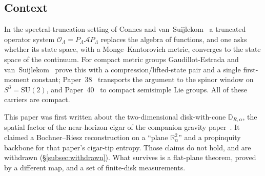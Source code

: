 \documentclass[11pt,a4paper]{article}
\theoremstyle{plain}
\theoremstyle{definition}
\newcommand{\disk}{\mathbb{D}}
\newcommand{\cone}{\disk_{R,\alpha}}
\newcommand{\Op}{\mathcal{O}}
\newcommand{\Acal}{\mathcal{A}}
\newcommand{\R}{\mathbb{R}}
\begin{document}
\subsection{Context}
In the spectral-truncation setting of Connes and
van~Suijlekom~\cite{connes_vs2021} a truncated operator system
$\Op_{\Lambda}=P_{\Lambda}\Acal P_{\Lambda}$ replaces the algebra of
functions, and one asks whether its state space, with a
Monge--Kantorovich metric, converges to the state space of the
continuum. For compact metric groups Gaudillot-Estrada and
van~Suijlekom~\cite{gaudillot_vs2025} prove this with a
compression/lifted-state pair and a single first-moment constant;
Paper~38~\cite{paper38} transports the argument to the spinor window on
$S^{3}=\mathrm{SU}(2)$, and Paper~40~\cite{paper40} to compact semisimple
Lie groups. All of these carriers are compact.

This paper was first written about the two-dimensional disk-with-cone
$\cone$, the spatial factor of the near-horizon cigar of the companion
gravity paper~\cite{paper51}. It claimed a Bochner--Riesz reconstruction
on a ``plane $\R^{2}_{\alpha}$'' and a propinquity backbone for that
paper's cigar-tip entropy. Those claims do not hold, and are withdrawn
(\S\ref{subsec:withdrawn}). What survives is a flat-plane theorem, proved
by a different map, and a set of finite-disk measurements.
\end{document}
